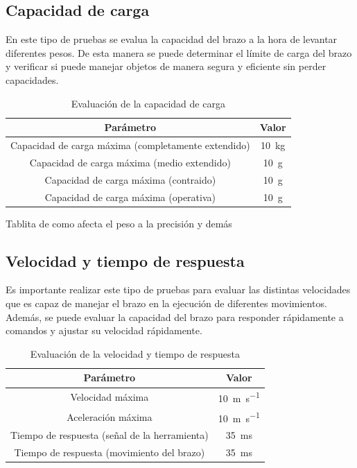 \subsection{Capacidad de carga}
En este tipo de pruebas se evalua la capacidad del brazo a la hora de levantar diferentes pesos. De esta manera se puede determinar 
el límite de carga del brazo y verificar si puede manejar objetos de manera segura y eficiente sin perder capacidades.
\begin{table}[H]
\begin{center}
\begin{tabular}{|c|c|}
\hline
\textbf{Parámetro} & \textbf{Valor} \\
\hline
Capacidad de carga máxima (completamente extendido) & \SI{10}{\kilo\gram} \\
Capacidad de carga máxima (medio extendido) & \SI{10}{\gram} \\
Capacidad de carga máxima (contraido) & \SI{10}{\gram} \\
Capacidad de carga máxima (operativa) & \SI{10}{\gram} \\
\hline
\end{tabular}
\caption{Evaluación de la capacidad de carga}
\label{cuadro:evaluacion_carga}
\end{center}
\end{table}

Tablita de como afecta el peso a la precisión y demás

\subsection{Velocidad y tiempo de respuesta}
Es importante realizar este tipo de pruebas para evaluar las distintas velocidades que es capaz de manejar el brazo en la ejecución 
de diferentes movimientos. Además, se puede evaluar la capacidad del brazo para responder rápidamente a comandos y ajustar su 
velocidad rápidamente.

\begin{table}[H]
\begin{center}
\begin{tabular}{|c|c|}
\hline
\textbf{Parámetro} & \textbf{Valor} \\
\hline
Velocidad máxima & \SI{10}{\meter\per\second}\\
Aceleración máxima & \SI{10}{\meter\per\second}\\
Tiempo de respuesta (señal de la herramienta) & \SI{35}{\milli\second} \\
Tiempo de respuesta (movimiento del brazo) & \SI{35}{\milli\second} \\
\hline
\end{tabular}
\caption{Evaluación de la velocidad y tiempo de respuesta}
\label{cuadro:evaluacion_velocidad}
\end{center}
\end{table}

